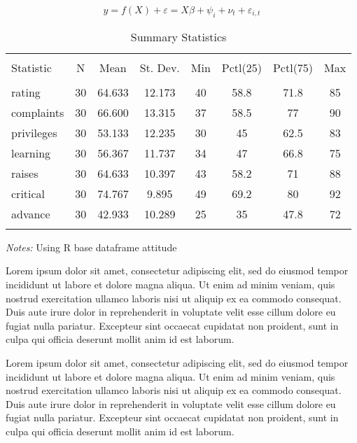 \documentclass[11pt]{article}
\begin{document}
\begin{equation}\label{fe_reg}
    y = f(X) + \varepsilon = X \beta + \psi_i + \nu_t + \varepsilon_{i,t} 
\end{equation}


\begin{table}[tp] \centering 
\caption{Summary Statistics}
\label{summ_stat}
    \begin{tabular}{@{\extracolsep{5pt}}lccccccc} 
    \hline 
    \hline \\[-1.8ex] 
    Statistic & \multicolumn{1}{c}{N} & \multicolumn{1}{c}{Mean} & \multicolumn{1}{c}{St. Dev.} & \multicolumn{1}{c}{Min} & \multicolumn{1}{c}{Pctl(25)} & \multicolumn{1}{c}{Pctl(75)} & \multicolumn{1}{c}{Max} \\ 
    \hline \\[-1.8ex] 
    rating & 30 & 64.633 & 12.173 & 40 & 58.8 & 71.8 & 85 \\ 
    complaints & 30 & 66.600 & 13.315 & 37 & 58.5 & 77 & 90 \\ 
    privileges & 30 & 53.133 & 12.235 & 30 & 45 & 62.5 & 83 \\ 
    learning & 30 & 56.367 & 11.737 & 34 & 47 & 66.8 & 75 \\ 
    raises & 30 & 64.633 & 10.397 & 43 & 58.2 & 71 & 88 \\ 
    critical & 30 & 74.767 & 9.895 & 49 & 69.2 & 80 & 92 \\ 
    advance & 30 & 42.933 & 10.289 & 25 & 35 & 47.8 & 72 \\ 
    \hline \\[-1.8ex] 
    \end{tabular} 
    
    \textit{Notes:} Using R base dataframe attitude \\ 
\end{table} 

Lorem ipsum dolor sit amet, consectetur adipiscing elit, sed do eiusmod tempor incididunt ut labore et dolore magna aliqua. Ut enim ad minim veniam, quis nostrud exercitation ullamco laboris nisi ut aliquip ex ea commodo consequat. Duis aute irure dolor in reprehenderit in voluptate velit esse cillum dolore eu fugiat nulla pariatur. Excepteur sint occaecat cupidatat non proident, sunt in culpa qui officia deserunt mollit anim id est laborum. 

Lorem ipsum dolor sit amet, consectetur adipiscing elit, sed do eiusmod tempor incididunt ut labore et dolore magna aliqua. Ut enim ad minim veniam, quis nostrud exercitation ullamco laboris nisi ut aliquip ex ea commodo consequat. Duis aute irure dolor in reprehenderit in voluptate velit esse cillum dolore eu fugiat nulla pariatur. Excepteur sint occaecat cupidatat non proident, sunt in culpa qui officia deserunt mollit anim id est laborum.
\end{document}

